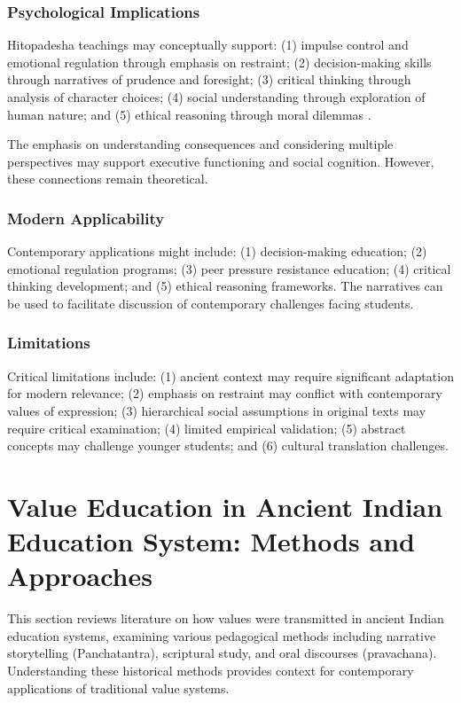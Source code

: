 \documentclass[12pt,a4paper,twocolumn]{article}
\begin{document}
\subsubsection{Psychological Implications}

Hitopadesha teachings may conceptually support: (1) impulse control and emotional regulation through emphasis on restraint; (2) decision-making skills through narratives of prudence and foresight; (3) critical thinking through analysis of character choices; (4) social understanding through exploration of human nature; and (5) ethical reasoning through moral dilemmas \citep{Kumar2018}.

The emphasis on understanding consequences and considering multiple perspectives may support executive functioning and social cognition. However, these connections remain theoretical.

\subsubsection{Modern Applicability}

Contemporary applications might include: (1) decision-making education; (2) emotional regulation programs; (3) peer pressure resistance education; (4) critical thinking development; and (5) ethical reasoning frameworks. The narratives can be used to facilitate discussion of contemporary challenges facing students.

\subsubsection{Limitations}

Critical limitations include: (1) ancient context may require significant adaptation for modern relevance; (2) emphasis on restraint may conflict with contemporary values of expression; (3) hierarchical social assumptions in original texts may require critical examination; (4) limited empirical validation; (5) abstract concepts may challenge younger students; and (6) cultural translation challenges.

\section{Value Education in Ancient Indian Education System: Methods and Approaches}

This section reviews literature on how values were transmitted in ancient Indian education systems, examining various pedagogical methods including narrative storytelling (Panchatantra), scriptural study, and oral discourses (pravachana). Understanding these historical methods provides context for contemporary applications of traditional value systems.
\end{document}
